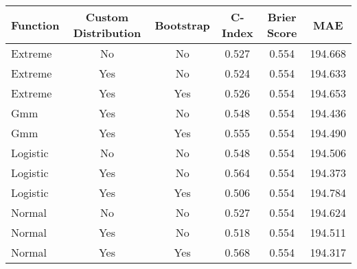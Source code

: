 \begin{tabular}{lccccc}
\toprule
Function & Custom Distribution & Bootstrap & C-Index & Brier Score & MAE \\
\midrule
Extreme & No & No & 0.527 & 0.554 & 194.668 \\
Extreme & Yes & No & 0.524 & 0.554 & 194.633 \\
Extreme & Yes & Yes & 0.526 & 0.554 & 194.653 \\
Gmm & Yes & No & 0.548 & 0.554 & 194.436 \\
Gmm & Yes & Yes & 0.555 & 0.554 & 194.490 \\
Logistic & No & No & 0.548 & 0.554 & 194.506 \\
Logistic & Yes & No & 0.564 & 0.554 & 194.373 \\
Logistic & Yes & Yes & 0.506 & 0.554 & 194.784 \\
Normal & No & No & 0.527 & 0.554 & 194.624 \\
Normal & Yes & No & 0.518 & 0.554 & 194.511 \\
Normal & Yes & Yes & 0.568 & 0.554 & 194.317 \\
\bottomrule
\end{tabular}
